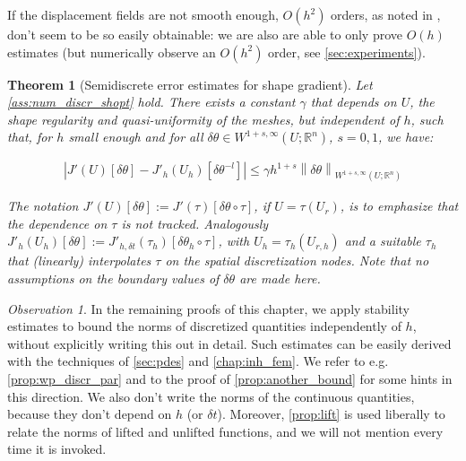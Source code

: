 \documentclass[english,a4paper,10pt,oneside]{scrbook}	%
\theoremstyle{break}
\newtheorem{thm}[equation]{Theorem}
\theoremstyle{remark}
\newtheorem{obs}[equation]{Observation}
\newcommand{\mR}{\mathbb{R}}
\newcommand{\norm}[1]{\left\lVert#1\right\rVert}
\newcommand{\te}{\theta}
\begin{document}
If the displacement fields are not smooth enough, $O(h^2)$ orders, as noted in \cite{paganini}, don't seem to be so easily obtainable: we are also are able to only prove $O(h)$ estimates (but numerically observe an $O(h^2)$ order, see \cref{sec:experiments}).


\begin{thm}[Semidiscrete error estimates for shape gradient]
\label{thm:superconvergence_sd}
Let \cref{ass:num_discr_shopt} hold. There exists a constant $\gamma$ that depends on $U$, the shape regularity and quasi-uniformity of the meshes, but independent of $h$, such that, for $h$ small enough and for all $\delta \te \in W^{1+s,\infty}(U;\mR^n)$, $s=0,1$, we have:

\begin{align*}
	\left |J'(U)[\delta \te] - J'_h(U_h)[\delta \te^{-l}] \right|\leq \gamma  h^{1+s} \norm{\delta \te}_{W^{1+s,\infty}(U;\mR^n)}
\end{align*}

%

The notation $J'(U)[\delta \te]:=J'(\tau)[\delta \te\circ \tau]$, if $U=\tau(U_r)$, is to emphasize that the dependence on $\tau$ is not tracked.
Analogously $J'_{h}(U_h)[\delta \te]:=J'_{h,\delta t}(\tau_h)[\delta \te_h\circ \tau]$, with $U_h = \tau_h(U_{r,h})$ and a suitable $\tau_h$ that (linearly) interpolates $\tau$ on the spatial discretization nodes. Note that no assumptions on the boundary values of $\delta \te$ are made here.

\end{thm}

\begin{obs}
In the remaining proofs of this chapter, we apply stability estimates to bound the norms of discretized quantities independently of $h$, without explicitly writing this out in detail. Such estimates can be easily derived with the techniques of \cref{sec:pdes} and \cref{chap:inh_fem}. We refer to e.g. \cref{prop:wp_discr_par} and to the proof of \cref{prop:another_bound} for some hints in this direction. We also don't write the norms of the continuous quantities, because they don't depend on $h$ (or $\delta t$). Moreover, \cref{prop:lift} is used liberally to relate the norms of lifted and unlifted functions, and we will not mention every time it is invoked.
\end{obs}
\end{document}
